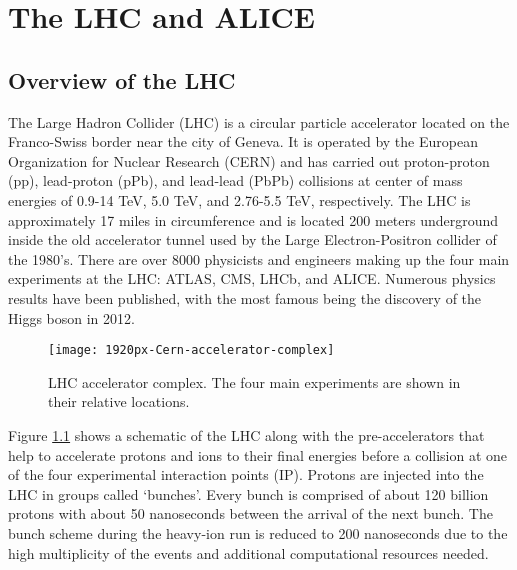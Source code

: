\chapter{The LHC and ALICE}\label{ch:alice}

\section{Overview of the LHC}\label{sec:LHC}
The Large Hadron Collider (LHC)\cite{doi:10.1142/S0217751X13300354} is a circular particle accelerator located on the Franco-Swiss border near the city of Geneva.  It is operated by the European Organization for Nuclear Research (CERN) and has carried out proton-proton (pp), lead-proton (pPb), and lead-lead (PbPb) collisions at center of mass energies of  0.9-14 TeV, 5.0 TeV, and 2.76-5.5 TeV, respectively.  The LHC is approximately 17 miles in circumference and is located 200 meters underground inside the old accelerator tunnel used by the Large Electron-Positron\cite{Taylor:2017edx} collider of the 1980's.  There are over 8000 physicists and engineers making up the four main experiments at the LHC: ATLAS\cite{Aad:2008zzm}, CMS\cite{Chatrchyan:2008aa}, LHCb\cite{Alves:2008zz}, and ALICE\cite{Aamodt:2008zz}.   Numerous physics results have been published, with the most famous being the discovery of the Higgs boson in 2012\cite{Chatrchyan:2012xdj}\cite{Aad:2012tfa}.

\begin{figure}[h]
\texttt{[image: 1920px-Cern-accelerator-complex]}
\centering
\caption{LHC accelerator complex.  The four main experiments are shown in their relative locations\cite{Mobs:2197559}.}
\label{fig:AccComp}
\end{figure}

Figure \ref{fig:AccComp} shows a schematic of the LHC along with the pre-accelerators that help to accelerate protons and ions to their final energies before a collision at one of the four experimental interaction points (IP).  Protons are injected into the LHC in groups called `bunches'.  Every bunch is comprised of about 120 billion protons with about 50 nanoseconds between the arrival of the next bunch.  The bunch scheme during the heavy-ion run is reduced to 200 nanoseconds due to the high multiplicity of the events and additional computational resources needed. 

